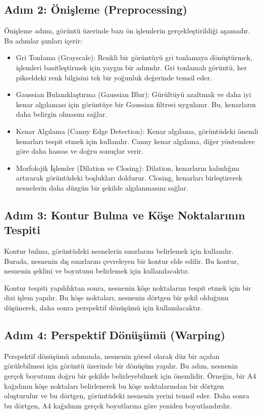 \documentclass[11pt,a4paper]{report}
\begin{document}
	\subsection{Adım 2: Önişleme (Preprocessing)}
	Önişleme adımı, görüntü üzerinde bazı ön işlemlerin gerçekleştirildiği aşamadır. Bu adımlar şunları içerir:
	\begin{itemize}
	\item Gri Tonlama (Grayscale): Renkli bir görüntüyü gri tonlamaya dönüştürmek, işlemleri basitleştirmek için yaygın bir adımdır. Gri tonlamalı görüntü, her pikseldeki renk bilgisini tek bir yoğunluk değerinde temsil eder.
	
	\item Gaussian Bulanıklaştırma (Gaussian Blur): Gürültüyü azaltmak ve daha iyi kenar algılaması için görüntüye bir Gaussian filtresi uygulanır. Bu, kenarların daha belirgin olmasını sağlar.
	
	\item Kenar Algılama (Canny Edge Detection): Kenar algılama, görüntüdeki önemli kenarları tespit etmek için kullanılır. Canny kenar algılama, diğer yöntemlere göre daha hassas ve doğru sonuçlar verir.
	
	\item Morfolojik İşlemler (Dilation ve Closing): Dilation, kenarların kalınlığını artırarak görüntüdeki boşlukları doldurur. Closing, kenarları birleştirerek nesnelerin daha düzgün bir şekilde algılanmasını sağlar.
	\end{itemize}
	
	\subsection{Adım 3: Kontur Bulma ve Köşe Noktalarının Tespiti}
	Kontur bulma, görüntüdeki nesnelerin sınırlarını belirlemek için kullanılır. Burada, nesnenin dış sınırlarını çevreleyen bir kontur elde edilir. Bu kontur, nesnenin şeklini ve boyutunu belirlemek için kullanılacaktır.
	
	Kontur tespiti yapıldıktan sonra, nesnenin köşe noktalarını tespit etmek için bir dizi işlem yapılır. Bu köşe noktaları, nesnenin dörtgen bir şekil olduğunu düşünerek, daha sonra perspektif dönüşümü için kullanılacaktır.
	
	\subsection{Adım 4: Perspektif Dönüşümü (Warping)}
	Perspektif dönüşümü adımında, nesnenin görsel olarak düz bir açıdan görülebilmesi için görüntü üzerinde bir dönüşüm yapılır. Bu adım, nesnenin gerçek boyutunu doğru bir şekilde belirleyebilmek için önemlidir. Örneğin, bir A4 kağıdının köşe noktaları belirlenerek bu köşe noktalarından bir dörtgen oluşturulur ve bu dörtgen, görüntüdeki nesnenin yerini temsil eder. Daha sonra bu dörtgen, A4 kağıdının gerçek boyutlarına göre yeniden boyutlandırılır.
	
\end{document}

